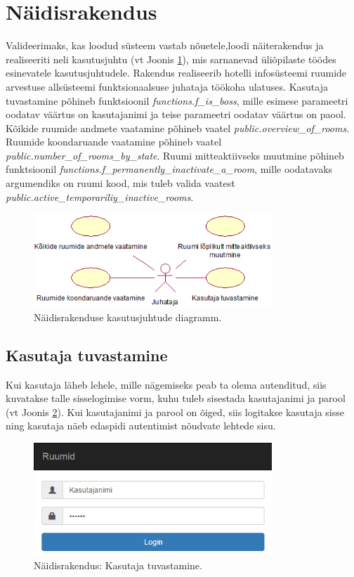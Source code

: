 \documentclass[a4paper,12pt]{article} %
\begin{document}
\section{Näidisrakendus}
Valideerimaks, kas loodud süsteem vastab nõuetele,loodi näiterakendus ja realiseeriti neli kasutusjuhtu (vt Joonis \ref{fig_näidisrakendus_kasutusjuhtude_eskiismudel}), mis sarnanevad üliõpilaste töödes esinevatele kasutusjuhtudele. \cite{pgapexSampleApp} Rakendus realiseerib hotelli infosüsteemi ruumide arvestuse allsüsteemi funktsionaalsuse juhataja töökoha ulatuses. Kasutaja tuvastamine põhineb funktsioonil \textit{functions.f\_is\_boss}, mille esimese parameetri oodatav väärtus on kasutajanimi ja teise parameetri oodatav väärtus on paool. Kõikide ruumide andmete vaatamine põhineb vaatel \textit{public.overview\_of\_rooms}. Ruumide koondaruande vaatamine põhineb vaatel \textit{public.number\_of\_rooms\_by\_state}. Ruumi mitteaktiivseks muutmine põhineb funktsioonil \textit{functions.f\_permanently\_inactivate\_a\_room}, mille oodatavaks argumendiks on ruumi kood, mis tuleb valida vaatest \textit{public.active\_temporariliy\_inactive\_rooms}.
\begin{figure}[H]
\centering
\includegraphics[width=0.8\textwidth]{./diagrams/sample-application-use-case-diagram.png}
\caption{Näidisrakenduse kasutusjuhtude diagramm.}
\label{fig_näidisrakendus_kasutusjuhtude_eskiismudel}
\end{figure}
\subsection{Kasutaja tuvastamine}
Kui kasutaja läheb lehele, mille nägemiseks peab ta olema autenditud, siis kuvatakse talle sisselogimise vorm, kuhu tuleb sisestada kasutajanimi ja parool (vt Joonis \ref{fig_näidisrakendus_kasutaja_tuvastamine}). Kui kasutajanimi ja parool on õiged, siis logitakse kasutaja sisse ning kasutaja näeb edaspidi autentimist nõudvate lehtede sisu.
\begin{figure}[H]
\centering
\includegraphics[width=0.8\textwidth]{./diagrams/sample-app-user-auth.png}
\caption{Näidisrakendus: Kasutaja tuvastamine.}
\label{fig_näidisrakendus_kasutaja_tuvastamine}
\end{figure}
\end{document}
